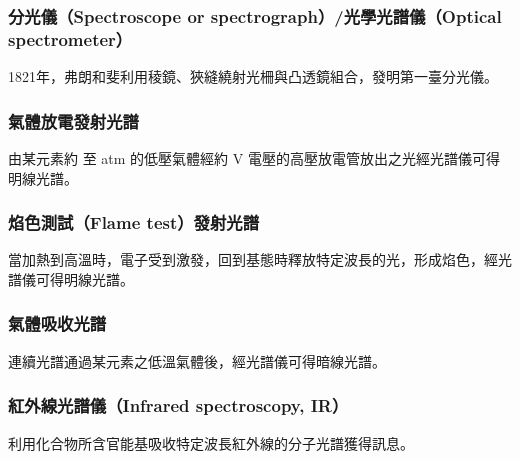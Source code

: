 \documentclass[a4paper,12pt]{article}
\begin{document}
\subsubsection{分光儀（Spectroscope or spectrograph）/光學光譜儀（Optical spectrometer）}
1821年，弗朗和斐利用稜鏡、狹縫繞射光柵與凸透鏡組合，發明第一臺分光儀。
\subsubsection{氣體放電發射光譜}
由某元素約 至 atm 的低壓氣體經約  V 電壓的高壓放電管放出之光經光譜儀可得明線光譜。
\subsubsection{焰色測試（Flame test）發射光譜}
當加熱到高溫時，電子受到激發，回到基態時釋放特定波長的光，形成焰色，經光譜儀可得明線光譜。
\subsubsection{氣體吸收光譜}
連續光譜通過某元素之低溫氣體後，經光譜儀可得暗線光譜。
\subsubsection{紅外線光譜儀（Infrared spectroscopy, IR）}
利用化合物所含官能基吸收特定波長紅外線的分子光譜獲得訊息。
\end{document}
